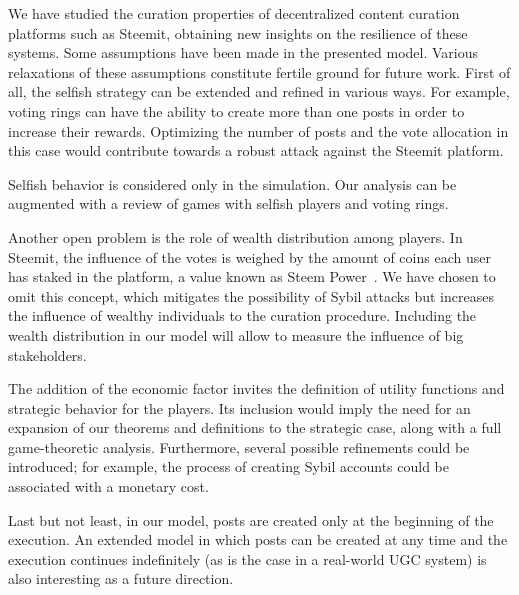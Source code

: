 
  We have studied the curation properties of decentralized content curation
  platforms such as Steemit, obtaining new insights on the resilience of these
  systems. Some assumptions have been made in the presented model. Various
  relaxations of these assumptions constitute fertile ground for future work.
  First of all, the selfish strategy can be extended and refined in various
  ways. For example, voting rings can have the ability to create more than one
  posts in order to increase their rewards. Optimizing the number of posts and
  the vote allocation in this case would contribute towards a robust attack
  against the Steemit platform.

  Selfish behavior is considered only in the simulation. Our analysis can be
  augmented with a review of games with selfish players and voting rings.

  Another open problem is the role of wealth distribution among players. In
  Steemit, the influence of the votes is weighed by the amount of coins each
  user has staked in the platform, a value known as Steem Power~\cite{steemit}.
  We have chosen to omit this concept, which mitigates the possibility of Sybil
  attacks but increases the influence of wealthy individuals to the curation
  procedure. Including the wealth distribution in our model will allow to measure  the influence of big stakeholders.

  The addition of the economic factor invites the definition of utility
  functions and strategic behavior for the players. Its inclusion would imply
  the need for an expansion of our theorems and definitions to the strategic
  case, along with a full game-theoretic analysis. Furthermore, several possible
  refinements could be introduced; for example, the process of creating Sybil
  accounts could be associated with a monetary cost.

  Last but not least, in our model, posts are created only at the beginning of
  the execution. An extended model in which posts can be created at any time and
  the execution continues indefinitely (as is the case in a real-world UGC system)
  is also interesting as a future direction.
